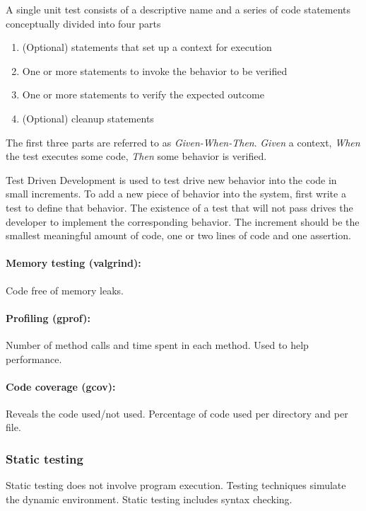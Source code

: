 \documentclass[12pt, titlepage]{article}
\begin{document}
A single unit test consists of a descriptive name and a series of code statements conceptually
divided into four parts

\begin{enumerate}
  \item (Optional) statements that set up a context for execution
  \item One or more statements to invoke the behavior to be verified
  \item One or more statements to verify the expected outcome
  \item (Optional) cleanup statements
\end{enumerate}

The first three parts are referred to as {\it Given-When-Then}. {\it Given} a context, {\it When}
the test executes some code, {\it Then} some behavior is verified.

Test Driven Development is used to test drive new behavior into the code in small increments. To
add a new piece of behavior into the system, first write a test to define that behavior. The
existence of a test that will not pass drives the developer to implement the corresponding behavior.
The increment should be the smallest meaningful amount of code, one or two lines of code and one assertion.

\paragraph{Memory testing (valgrind):}
Code free of memory leaks.

\paragraph{Profiling (gprof):}
Number of method calls and time spent in each method. Used to help performance.

\paragraph{Code coverage (gcov):}
Reveals the code used/not used. Percentage of code used per directory and per file.

\subsubsection{Static testing}
Static testing does not involve program execution.
Testing techniques simulate the dynamic environment.
Static testing includes syntax checking.
\end{document}
